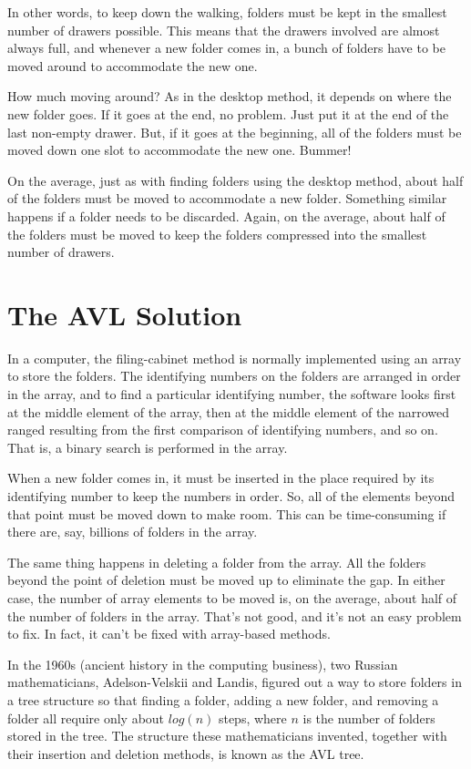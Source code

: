 In other words, to keep down the walking, folders must be kept in
the smallest number of drawers possible. This means that the drawers
involved are almost always full, and whenever a new folder comes in,
a bunch of folders have to be moved around to accommodate the new
one.

How much moving around? As in the desktop method, it depends on
where the new folder goes. If it goes at the end, no problem. Just
put it at the end of the last non-empty drawer. But, if it goes at
the beginning, all of the folders must be moved down one slot to
accommodate the new one. Bummer!

On the average, just as with finding folders using the desktop
method, about half of the folders must be moved to accommodate a new
folder. Something similar happens if a folder needs to be discarded.
Again, on the average, about half of the folders must be moved to
keep the folders compressed into the smallest number of drawers.

\section{The AVL Solution}

In a computer, the filing-cabinet method is normally implemented
using an array to store the folders. The identifying numbers on the
folders are arranged in order in the array, and to find a particular
identifying number, the software looks first at the middle element
of the array, then at the middle element of the narrowed ranged
resulting from the first comparison of identifying numbers, and so
on. That is, a binary search is performed in the array.

When a new folder comes in, it must be inserted in the
place required by its identifying number to keep the numbers
in order. So, all of the elements beyond that point
must be moved down to make room. This can be time-consuming if there
are, say, billions of folders in the array.

The same thing happens in deleting a folder from the array. All the
folders beyond the point of deletion must be moved up to eliminate
the gap. In either case, the number of array elements to be moved
is, on the average, about half of the number of folders in the array.
That's not good, and it's not an easy problem to fix.
In fact, it can't be fixed with array-based methods.

In the 1960s (ancient history in the computing business),
two Russian mathematicians, Adelson-Velskii and Landis,
figured out a way to store folders in a tree structure so that
finding a folder, adding a new folder, and removing a folder all
require only about $log(n)$ steps, where $n$ is the number
of folders stored in the tree. The structure these mathematicians
invented, together with their insertion and deletion methods, is
known as the AVL tree. \label{AVL-tree}

